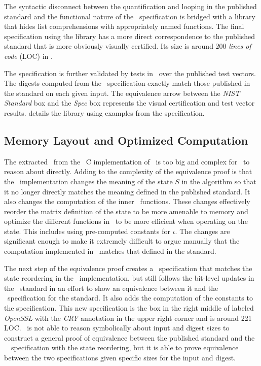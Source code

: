 The syntactic disconnect between the quantification and looping in the published standard and the functional nature of the \cryptol\ specification is bridged with a library that hides list comprehensions with appropriately named functions.
The final specification using the library has a more direct correspondence to the published standard that is more obviously visually certified.
Its size is around $200$ \emph{lines of code} (LOC) in \cryptol.

The specification is further validated by tests in \cryptol\ over the published test vectors.
The digests computed from the \cryptol\ specification exactly match those published in the standard on each given input.
The equivalence arrow between the \emph{NIST Standard} box and the \emph{Spec} box represents the visual certification and test vector results.
 details the library using examples from the specification.

\subsection{Memory Layout and Optimized Computation}

The extracted \sawcore\ from the \openssl\ C implementation of \shaThree\ is too big and complex for \saw\ to reason about directly.
Adding to the complexity of the equivalence proof is that the \openssl\ implementation changes the meaning of the state $S$ in the algorithm so that it no longer directly matches the meaning defined in the published standard.
It also changes the computation of the inner \keccak\ functions.
These changes effectively reorder the matrix definition of the state to be more amenable to memory and optimize the different functions in \keccak\ to be more efficient when operating on the state.
This includes using pre-computed constants for $\iota$.
The changes are significant enough to make it extremely difficult to argue manually that the computation implemented in \openssl\ matches that defined in the standard.

The next step of the equivalence proof creates a \cryptol\ specification that matches the state reordering in the \openssl\ implementation, but still follows the bit-level updates in the \fips\ standard in an effort to show an equivalence between it and the \cryptol\ specification for the standard.
It also adds the computation of the constants to the specification.
This new specification is the box in the right middle of  labeled \emph{OpenSSL} with the \emph{CRY} annotation in the upper right corner and is around 221 LOC. \saw\ is not able to reason symbolically about input and digest sizes to construct a general proof of equivalence between the published standard and the \openssl\ \cryptol\ specification with the state reordering, but it is able to prove equivalence between the two specifications given specific sizes for the input and digest.


